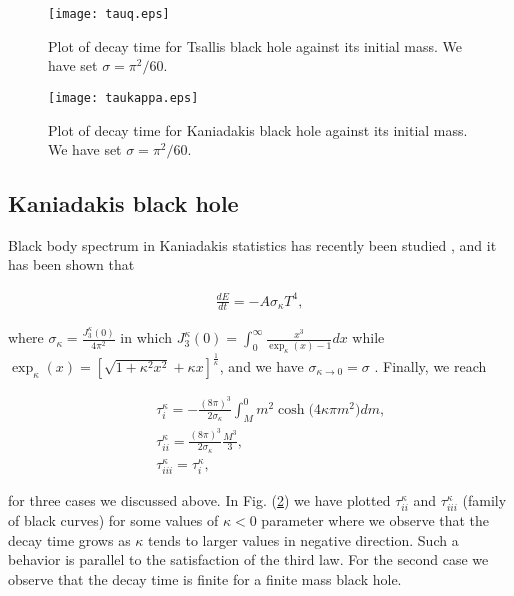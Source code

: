 \documentclass[twocolumn,preprintnumbers,amsmath,nofootinbib,amssymb]{revtex4}
\begin{document}
\begin{figure}
    \begin{center}
        \texttt{[image: tauq.eps]}
        \caption{Plot of decay time for Tsallis black hole against its initial mass. We have set $\sigma=\pi^2/60$.}\label{fig5}
    \end{center}
\end{figure}


\begin{figure}
    \begin{center}
        \texttt{[image: taukappa.eps]}
        \caption{Plot of decay time for Kaniadakis black hole against its initial mass. We have set $\sigma=\pi^2/60$.}\label{fig6}
    \end{center}
\end{figure}

\subsection{Kaniadakis black hole}

Black body spectrum in Kaniadakis statistics has recently been
studied \cite{kanbb1,kanbb2}, and it has been shown that
\cite{kanbb1}

\begin{eqnarray}\label{20}
\frac{dE}{dt}=-A\sigma_\kappa T^4,
\end{eqnarray}

\noindent where $\sigma_\kappa=\frac{J_3^\kappa(0)}{4\pi^2}$ in
which $J_3^\kappa(0)=\int_0^\infty\frac{x^3}{\exp_\kappa(x)-1}dx$
while $\exp_\kappa(x)=[\sqrt{1+\kappa^2x^2}+\kappa
x]^\frac{1}{\kappa}$, and we have
$\sigma_{\kappa\rightarrow0}=\sigma$ \cite{kanbb1}. Finally, we
reach

\begin{eqnarray}\label{21}
&&\!\!\!\!\!\!\!\tau_i^{\kappa}=-\frac{(8\pi)^3}{2\sigma_\kappa}\int_M^0m^2\cosh\big(4\kappa\pi m^2\big)dm,\nonumber\\
&&\!\!\!\!\!\!\!\tau_{ii}^{\kappa}=\frac{(8\pi)^3}{2\sigma_\kappa}\frac{M^3}{3},\\\nonumber
&&\!\!\!\!\!\!\!\tau_{iii}^{\kappa}=\tau_i^{\kappa},
\end{eqnarray}

\noindent for three cases we discussed above. In Fig. (\ref{fig6})
we have plotted $\tau_{ii}^{\kappa}$ and $\tau_{iii}^{\kappa}$
(family of black curves) for some values of $\kappa<0$ parameter
where we observe that the decay time grows as $\kappa$ tends to
larger values in negative direction. Such a behavior is parallel
to the satisfaction of the third law. For the second case we
observe that the decay time is finite for a finite mass black
hole.
\end{document}
